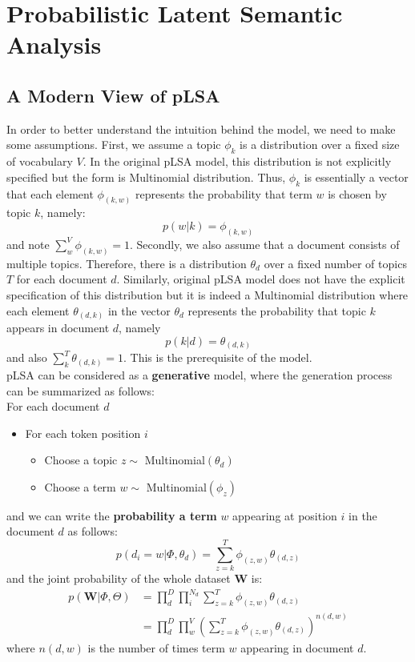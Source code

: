 \documentclass[a4paper, 12pt]{book} %
\begin{document}
\section{Probabilistic Latent Semantic Analysis}
\subsection{A Modern View of pLSA}
In order to better understand the intuition behind the model, we need to make some assumptions. First, we assume a topic $\phi_k$ is a distribution over a fixed size of vocabulary $V$. In the original pLSA model, this distribution is not explicitly specified but the form is Multinomial distribution. Thus, $\phi_k$ is essentially a vector that each element $\phi_{(k,w)}$ represents the probability that term $w$ is chosen by topic $k$, namely:
$$p(w|k)=\phi_{(k,w)}$$
and note $\sum_{w}^{V}\phi_{(k,w)}=1$. Secondly, we also assume that a document consists of multiple topics. Therefore, there is a distribution $\theta_{d}$ over a fixed number of topics $T$ for each document $d$. Similarly, original pLSA model does not have the explicit specification of this distribution but it is indeed a Multinomial distribution where each element $\theta_{(d,k)}$ in the vector $\theta_{d}$ represents the probability that topic $k$ appears in document $d$, namely
$$p(k|d)=\theta_{(d,k)}$$
and also $\sum_{k}^{T}\theta_{(d,k)}=1$. This is the prerequisite of the model. \\

pLSA can be considered as a \textbf{generative} model, where the generation process can be summarized as follows: \\

For each document $d$
\begin{itemize}
	\item For each token position $i$
	\begin{itemize}
		\item Choose a topic $z \sim $ Multinomial$(\theta_d)$
		\item Choose a term $w \sim $ Multinomial$(\phi_z)$
	\end{itemize}
\end{itemize}
and we can write the \textbf{probability a term} $w$ appearing at position $i$ in the document $d$ as follows:
\begin{equation}
	p(d_i=w|\Phi ,\theta_{d})=\sum_{z=k}^{T}{\phi_{(z,w)}\theta_{(d,z)}}
\end{equation}
and the joint probability of the whole dataset $\mathbf{W}$ is:
\begin{equation}
\begin{split} p(\mathbf{W}|\Phi,\Theta) & = \prod_d^D{\prod_i^{N_d}{\sum_{z=k}^T{\phi_{(z,w)}\theta_{(d,z)}}}} \\
& = \prod_d^D{\prod_w^{V}{(\sum_{z=k}^T{\phi_{(z,w)}\theta_{(d,z)}})^{n{(d,w)}}}} \end{split} \end{equation}
where $n(d,w)$ is the number of times term $w$ appearing in document $d$.
\end{document}
